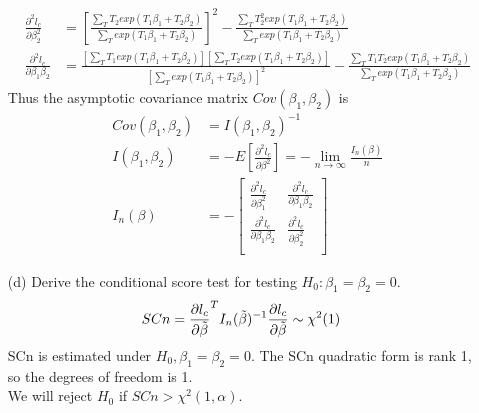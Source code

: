 \documentclass[11pt]{article} %
\begin{document}
\begin{itemize}
\begin{align*}
		\frac{\partial^2 l_c}{\partial \beta_2^2} &= \left[\frac{\sum_{T} T_2 exp \left( T_1\beta_1 + T_2\beta_2\right)}{\sum_{T} exp \left( T_1\beta_1 + T_2\beta_2\right)} \right]^2 - \frac{\sum_{T} T_2^2 exp \left( T_1\beta_1 + T_2\beta_2\right)}{\sum_{T} exp \left( T_1\beta_1 + T_2\beta_2\right)}\\ 
		\frac{\partial^2 l_c}{\partial \beta_1 \beta_2} &=\frac{\left[ \sum_{T} T_1 exp \left( T_1\beta_1 + T_2\beta_2\right)\right] \left[ \sum_{T} T_2 exp \left( T_1\beta_1 + T_2\beta_2\right)\right]}{\left[ \sum_{T} exp \left( T_1\beta_1 + T_2\beta_2\right)\right]^2}  - \frac{\sum_{T} T_1 T_2 exp \left( T_1\beta_1 + T_2\beta_2\right)}{\sum_{T} exp \left( T_1\beta_1 + T_2\beta_2\right)}
	\end{align*}  
	Thus the asymptotic covariance matrix $Cov(\beta_1, \beta_2)$ is
	\begin{align*}
		Cov(\beta_1, \beta_2) &= I(\beta_1, \beta_2)^{-1}\\
		I(\beta_1, \beta_2) &= -E \left[ \frac{\partial^2 l_c}{\partial \beta^2} \right] =  -\lim_{n\to\infty} \frac{ I_n(\beta)}{n} \\
		I_n(\beta) &=- \begin{bmatrix}
			\frac{\partial^2 l_c}{\partial \beta_1^2}& \frac{\partial^2 l_c}{\partial \beta_1 \beta_2}\\
			\frac{\partial^2 l_c}{\partial \beta_1 \beta_2} &\frac{\partial^2 l_c}{\partial \beta_2^2}  \\
		\end{bmatrix}
	\end{align*}
	\item[(d)]Derive the conditional score test for testing $H_0: \beta_1= \beta_2 = 0$.\\
	\begin{align*}
		SCn &= \frac{\partial l_c}{\partial \Tilde{\beta}}^T I_n(\Tilde{\beta})^{-1} \frac{\partial l_c}{\partial \Tilde{\beta}} \sim \chi^2(1)
	\end{align*} 
	SCn is estimated under $H_0, \beta_1=\beta_2 = 0$. The SCn quadratic form is rank 1, so the degrees of freedom is 1.\\
	We will reject $H_0$ if $SCn > \chi^2(1, \alpha)$.
\end{itemize}
\end{document}
